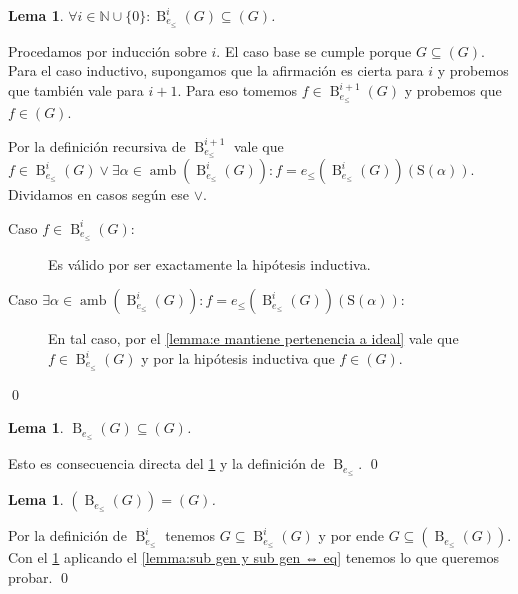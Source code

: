 \documentclass[12pt]{report}
\theoremstyle{customstyle}
\newtheorem{lemma}[theorem]{Lema}
\renewenvironment{proof}[1][\proofname]{{\noindent \bfseries #1: }}{\qed} %
\theoremstyle{factstyle}
\DeclareMathOperator{\amb}{amb}
\renewcommand{\S}{\text{S}}
\DeclareMathOperator{\B}{B}
\begin{document}
\begin{lemma}\label{lemma:Buchberger correctitud:3}
  $∀i ∈ ℕ ∪ \{0\} : \B_{e_≤}^{i}(G) ⊆ (G)$.
\end{lemma}
\begin{proof}
  Procedamos por inducción sobre $i$. El caso base se cumple porque $G ⊆ (G)$. Para el caso inductivo, supongamos que la afirmación es cierta para $i$ y probemos que también vale para $i + 1$. Para eso tomemos $f ∈ \B_{e_≤}^{i + 1}(G)$ y probemos que $f ∈ (G)$.

  Por la definición recursiva de $\B_{e_≤}^{i + 1}$ vale que $f ∈ \B_{e_≤}^i(G) ∨ ∃α ∈ \amb(\B_{e_≤}^i(G)) : f = e_≤(\B_{e_≤}^i(G))(\S(α))$. Dividamos en casos según ese $∨$.

  \begin{description}
    \item[Caso $f ∈ \B_{e_≤}^i(G)$:] Es válido por ser exactamente la hipótesis inductiva.
    \item[Caso $∃α ∈ \amb(\B_{e_≤}^i(G)) : f = e_≤(\B_{e_≤}^i(G))(\S(α))$:] En tal caso, por el \cref{lemma:e mantiene pertenencia a ideal} vale que $f ∈ \B_{e_≤}^i(G)$ y por la hipótesis inductiva que $f ∈ (G)$.
  \end{description}

\end{proof}

\begin{lemma}\label{lemma:Buchberger correctitud:4}
  $\B_{e_≤}(G) ⊆ (G)$.
\end{lemma}
\begin{proof}
  Esto es consecuencia directa del \cref{lemma:Buchberger correctitud:3} y la definición de $\B_{e_≤}$.
\end{proof}

\begin{lemma}\label{lemma:Buchberger correctitud:5}
  $(\B_{e_≤}(G)) = (G)$.
\end{lemma}
\begin{proof}
  Por la definición de $\B_{e_≤}^i$ tenemos $G ⊆ \B_{e_≤}^i(G)$ y por ende $G ⊆ (\B_{e_≤}(G))$. Con el \cref{lemma:Buchberger correctitud:4} aplicando el \cref{lemma:sub gen y sub gen ⇔ eq} tenemos lo que queremos probar.
\end{proof}
\end{document}
